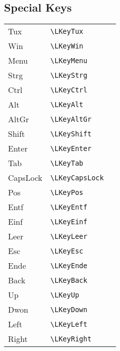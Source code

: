 \documentclass[11pt]{article}
\begin{document}
\subsection{Special Keys}
\begin{longtable}[l]{lll}
Tux         & \verb|\LKeyTux|      & \LARGE\strut\fbox{\LKeyTux} \\
Win         & \verb|\LKeyWin|      & \LARGE\strut\fbox{\LKeyWin} \\
Menu        & \verb|\LKeyMenu|     & \LARGE\strut\fbox{\LKeyMenu} \\
Strg        & \verb|\LKeyStrg|     & \LARGE\strut\fbox{\LKeyStrg} \\
Ctrl        & \verb|\LKeyCtrl|     & \LARGE\strut\fbox{\LKeyCtrl} \\
Alt         & \verb|\LKeyAlt|      & \LARGE\strut\fbox{\LKeyAlt} \\
AltGr       & \verb|\LKeyAltGr|    & \LARGE\strut\fbox{\LKeyAltGr} \\
Shift       & \verb|\LKeyShift|    & \LARGE\strut\fbox{\LKeyShift} \\
Enter       & \verb|\LKeyEnter|    & \LARGE\strut\fbox{\LKeyEnter} \\
Tab         & \verb|\LKeyTab|      & \LARGE\strut\fbox{\LKeyTab} \\
CapsLock    & \verb|\LKeyCapsLock| & \LARGE\strut\fbox{\LKeyCapsLock} \\
Pos         & \verb|\LKeyPos|      & \LARGE\strut\fbox{\LKeyPos} \\
Entf        & \verb|\LKeyEntf|     & \LARGE\strut\fbox{\LKeyEntf} \\
Einf        & \verb|\LKeyEinf|     & \LARGE\strut\fbox{\LKeyEinf} \\
Leer        & \verb|\LKeyLeer|     & \LARGE\strut\fbox{\LKeyLeer} \\
Esc         & \verb|\LKeyEsc|      & \LARGE\strut\fbox{\LKeyEsc} \\
Ende        & \verb|\LKeyEnde|     & \LARGE\strut\fbox{\LKeyEnde} \\
Back        & \verb|\LKeyBack|     & \LARGE\strut\fbox{\LKeyBack} \\
Up          & \verb|\LKeyUp|       & \LARGE\strut\fbox{\LKeyUp} \\
Dwon        & \verb|\LKeyDown|     & \LARGE\strut\fbox{\LKeyDown} \\
Left        & \verb|\LKeyLeft|     & \LARGE\strut\fbox{\LKeyLeft} \\
Right       & \verb|\LKeyRight|    & \LARGE\strut\fbox{\LKeyRight} \\

\end{longtable}
\end{document}
